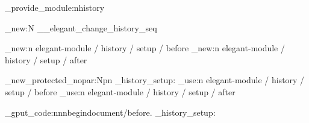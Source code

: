 \elegant_provide_module:n{history}


\seq_new:N \g__elegant_change_history_seq

\hook_new:n { elegant-module / history / setup / before }
\hook_new:n { elegant-module / history / setup / after }


\cs_new_protected_nopar:Npn \elegant_history_setup:
  {
    \hook_use:n { elegant-module / history / setup / before }
    \hook_use:n { elegant-module / history / setup / after }
  }


\hook_gput_code:nnn{begindocument/before}{.}
  { \elegant_history_setup: }


\endinput
